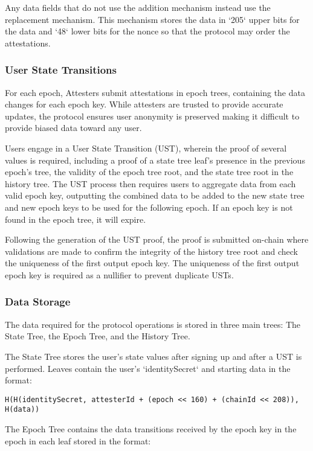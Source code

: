 \documentclass[11pt]{article}
\begin{document}
Any data fields that do not use the addition mechanism instead use the replacement mechanism. This mechanism stores the data in `205` upper bits for the data and `48` lower bits for the nonce so that the protocol may order the attestations.
\subsubsection{User State Transitions}
\label{sec:org555fe5d}

For each epoch, Attesters submit attestations in epoch trees, containing the data changes for each epoch key. While attesters are trusted to provide accurate updates, the protocol ensures user anonymity is preserved making it difficult to provide biased data toward any user.

Users engage in a User State Transition (UST), wherein the proof of several values is required, including a proof of a state tree leaf's presence in the previous epoch's tree, the validity of the epoch tree root, and the state tree root in the history tree. The UST process then requires users to aggregate data from each valid epoch key, outputting the combined data to be added to the new state tree and new epoch keys to be used for the following epoch. If an epoch key is not found in the epoch tree, it will expire.

Following the generation of the UST proof, the proof is submitted on-chain where validations are made to confirm the integrity of the history tree root and check the uniqueness of the first output epoch key. The uniqueness of the first output epoch key is required as a nullifier to prevent duplicate USTs.
\subsubsection{Data Storage}
\label{sec:org4e3128f}

The data required for the protocol operations is stored in three main trees: The State Tree, the Epoch Tree, and the History Tree.

The State Tree stores the user's state values after signing up and after a UST is performed. Leaves contain the user's `identitySecret` and starting data in the format:

\begin{verbatim}
H(H(identitySecret, attesterId + (epoch << 160) + (chainId << 208)), H(data))
\end{verbatim}

The Epoch Tree contains the data transitions received by the epoch key in the epoch in each leaf stored in the format:
\end{document}
